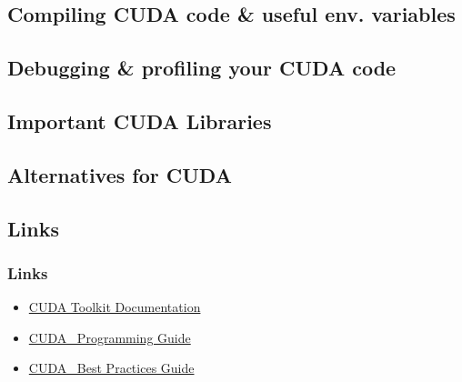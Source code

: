 \subsection{Compiling CUDA code \& useful env. variables} 

\subsection{Debugging \& profiling your CUDA code}

\subsection{Important CUDA Libraries}

\subsection{Alternatives for CUDA}

\subsection{Links}
\begin{frame}
   \frametitle{Links}
      \begin{itemize}
	      \item \href{https://docs.nvidia.com/cuda/index.html}{CUDA Toolkit Documentation}
              \item \href{https://docs.nvidia.com/cuda/cuda-c-programming-guide/index.html}{CUDA \CC\, Programming Guide}
	      \item \href{https://docs.nvidia.com/cuda/cuda-c-best-practices-guide/index.html}{CUDA \CC\, Best Practices Guide}	      
      \end{itemize}		      
\end{frame}	

